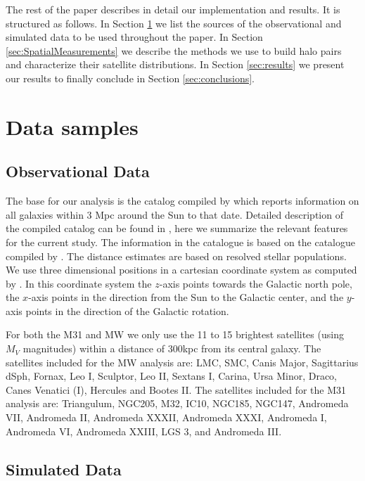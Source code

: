 \documentclass[a4paper,fleqn,usenatbib]{mnras}
\begin{document}
The rest of the paper describes in detail our implementation and
results. It is structured as follows. 
In Section \ref{sec:DataSamples} we list the sources of the observational and
simulated data to be used throughout the paper.
In Section \ref{sec:SpatialMeasurements} we describe the methods we
use to build halo pairs and  
characterize their satellite distributions.
In Section \ref{sec:results} we present our results to finally
conclude in Section \ref{sec:conclusions}. 



\section{Data samples}\label{sec:DataSamples}

\subsection{Observational Data}
\label{sec:obs}

The base for our analysis is the catalog compiled by
\cite{2014yCat..74351928P} which reports information on all 
galaxies within 3 Mpc around the Sun to that date. 
Detailed description of the compiled catalog can be found in
\cite{2013MNRAS.435.1928P}, here we summarize the relevant features
for the current study.
The information in the catalogue is based on the catalogue compiled by
\cite{2012AJ....144....4M}.
The distance estimates are based on resolved stellar populations. 
We use three dimensional positions in a cartesian coordinate system
as computed by \cite{2013MNRAS.435.1928P}.
In this coordinate system the $z$-axis points towards the Galactic north pole, the
$x$-axis points in the direction from the Sun to the Galactic center,
and the $y$-axis points in the direction of the Galactic rotation.


For both the M31 and MW we only use the 11 to 15 brightest satellites (using
$M_V$ magnitudes) within a distance of $300$kpc from its central galaxy.
The satellites included for the MW analysis are: 
LMC, SMC, Canis Major, Sagittarius dSph, Fornax, Leo I, Sculptor,
Leo II, Sextans I, Carina, Ursa Minor, Draco, Canes Venatici (I),
Hercules and Bootes II.
The satellites included for the M31 analysis are: Triangulum, NGC205,
M32, IC10, NGC185, NGC147, Andromeda VII, Andromeda II, Andromeda
XXXII, Andromeda XXXI, Andromeda I, Andromeda VI, Andromeda XXIII, LGS 3, 
 and Andromeda III.



\subsection{Simulated Data}
 
\end{document}
